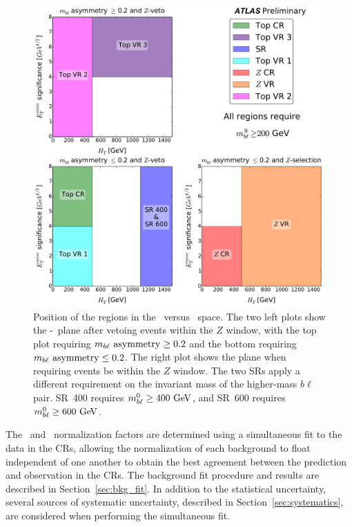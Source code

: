 \begin{figure}[ht]
  \centering
  \includegraphics[width=\textwidth]{figs/blstop/regions__met_sig__ht_plane.pdf}
  \caption{Position of the regions in the \METSIG\ versus \HT\ space.
    The two left plots show the \METSIG-\HT~plane after vetoing events within
    the $Z$ window, with the top plot requiring $m_{b\ell}~\mathrm{asymmetry} \geq 0.2$ and the
    bottom requiring $m_{b\ell}~\mathrm{asymmetry} \leq 0.2$.
    The right plot shows the plane when requiring events be within the $Z$
    window.
    The two SRs apply a different requirement on the
    invariant mass of the higher-mass $b\ell$ pair. SR~400 requires
    $\MBL^{0} \geq 400 \GeV$, and SR~600 requires $\MBL^{0} \geq 600 \GeV$.
  }
  \label{fig:region_coverage}
\end{figure}

The \TTBAR\ and \ZGAMMAJETS\ normalization factors are determined using a
simultaneous fit to the data in the CRs, allowing the normalization of each
background to float independent of one another to obtain the best agreement
between the prediction and observation in the CRs.
The background fit procedure and results are described in
Section~\ref{sec:bkg_fit}.
In addition to the statistical uncertainty, several sources of systematic
uncertainty, described in Section~\ref{sec:systematics}, are considered when
performing the simultaneous fit.


